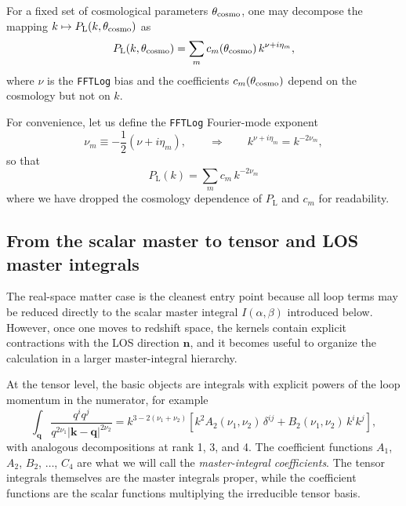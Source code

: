 \documentclass[a4paper,11pt]{article}
\newcommand{\codefont}[1]{{\texttt{#1}}}
\def\Plin{P_{\rm L}}
\renewcommand{\emph}[1]{\textit{#1}}
\newcommand{\nhat}{\hat{n}}
\newcommand{\vnhat}{\bm{\nhat}}
\newcommand{\vk}{\bm{k}}
\newcommand{\vq}{\bm{q}}
\newcommand{\<}{\langle}
\renewcommand{\>}{\rangle}
\def\Plin{P_\text{L}}
\begin{document}
For a fixed set of cosmological parameters \(\theta_{\rm cosmo}\), one may decompose the mapping
\(k\mapsto \Plin(k,\theta_{\rm cosmo})\) as
\begin{equation}
\Plin(k,\theta_{\rm cosmo})
=
\sum_m c_m(\theta_{\rm cosmo})\,k^{\nu+i\eta_m},
\end{equation}
where \(\nu\) is the \codefont{FFTLog} bias and the coefficients \(c_m(\theta_{\rm cosmo})\) depend on the cosmology but not on \(k\).

For convenience, let us define the \codefont{FFTLog} Fourier-mode exponent
\begin{equation}
\nu_m \equiv -\frac12(\nu+i\eta_m),
\qquad\Rightarrow\qquad
k^{\nu+i\eta_m}=k^{-2\nu_m},
\end{equation}
so that
\begin{equation}
\Plin(k)
=
\sum_m c_m\,k^{-2\nu_m}
\end{equation}
where we have dropped the cosmology dependence of \(\Plin\) and \(c_m\) for readability.

\subsection{From the scalar master to tensor and LOS master integrals}

The real-space matter case is the cleanest entry point because all loop terms may be reduced directly to the scalar master integral \(I(\alpha,\beta)\) introduced below. However, once one moves to redshift space, the kernels contain explicit contractions with the LOS direction \(\vnhat\), and it becomes useful to organize the calculation in a larger master-integral hierarchy.

At the tensor level, the basic objects are integrals with explicit powers of the loop momentum in the numerator, for example
\begin{equation}
\int_{\vq}\frac{q^i q^j}{q^{2\nu_1}|\vk-\vq|^{2\nu_2}}
=
k^{3-2(\nu_1+\nu_2)}
\left[
k^2 A_2(\nu_1,\nu_2)\,\delta^{ij}
+B_2(\nu_1,\nu_2)\,k^i k^j
\right],
\label{eq:tensor_master_rank2_note}
\end{equation}
with analogous decompositions at rank 1, 3, and 4. The coefficient functions \(A_1\), \(A_2\), \(B_2\), \(\ldots\), \(C_4\) are what we will call the \emph{master-integral coefficients}. The tensor integrals themselves are the master integrals proper, while the coefficient functions are the scalar functions multiplying the irreducible tensor basis.
\end{document}
